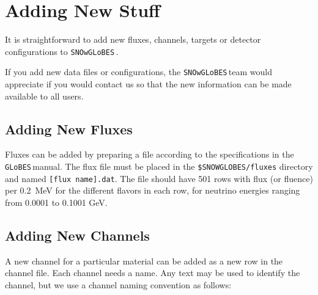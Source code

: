 \documentclass{article}
\newcommand{\snow}{\texttt{SNOwGLoBES}\,}
\newcommand{\glb}{\texttt{GLoBES}\,}
\begin{document}
\section{Adding New Stuff} \label{sec:newstuff}

It is straightforward to add new fluxes, channels, targets or detector configurations to \snow.

If you add new data files or configurations, the \snow team would appreciate if you would contact us so that the new information can be made available to all users.

\subsection{Adding New Fluxes}

Fluxes can be added by preparing a file according to the specifications in the \glb manual.  The flux file must be placed in the \texttt{\$SNOWGLOBES/fluxes} directory and named
\texttt{[flux name].dat}. The file should have 501 rows with flux (or fluence) per 0.2~MeV for the different flavors in each row, for neutrino energies ranging from 0.0001 to 0.1001 GeV.

\subsection{Adding New Channels}\label{subsec:addingchannel}

A new channel for a particular material can be added as a new row in the channel file.  Each channel needs a name.  Any text may be used to identify the channel, but we use a channel naming convention as follows: 
\end{document}
